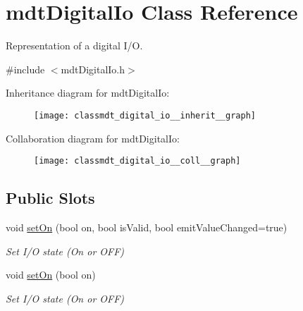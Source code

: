 \hypertarget{classmdt_digital_io}{
\section{mdtDigitalIo Class Reference}
\label{classmdt_digital_io}
}


Representation of a digital I/O.  




{\ttfamily \#include $<$mdtDigitalIo.h$>$}



Inheritance diagram for mdtDigitalIo:\nopagebreak
\begin{figure}[H]
\begin{center}
\leavevmode
\texttt{[image: classmdt\_digital\_io\_\_inherit\_\_graph]}
\end{center}
\end{figure}


Collaboration diagram for mdtDigitalIo:\nopagebreak
\begin{figure}[H]
\begin{center}
\leavevmode
\texttt{[image: classmdt\_digital\_io\_\_coll\_\_graph]}
\end{center}
\end{figure}
\subsection*{Public Slots}
\begin{DoxyCompactItemize}
\item 
void \hyperlink{classmdt_digital_io_a8feb155c430f67589ba776b7b03758d9}{setOn} (bool on, bool isValid, bool emitValueChanged=true)
\begin{DoxyCompactList}\small\item\em Set I/O state (On or OFF) \end{DoxyCompactList}\item 
void \hyperlink{classmdt_digital_io_a88308968532c1e23f695c43a62a3be40}{setOn} (bool on)
\begin{DoxyCompactList}\small\item\em Set I/O state (On or OFF) \end{DoxyCompactList}\end{DoxyCompactItemize}
